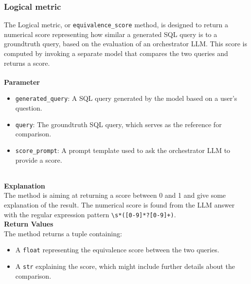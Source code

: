 \documentclass[12pt,a4paper]{article}
\begin{document}
\subsubsection*{Logical metric}




The Logical metric, or \texttt{equivalence\_score} method, is designed to return a numerical score representing how similar a generated SQL query is to a groundtruth query, based on the evaluation of an orchestrator LLM. This score is computed by invoking a separate model that compares the two queries and returns a score.
\\
\\
\textbf{Parameter}
\begin{itemize}
    \item \texttt{generated\_query}: A SQL query generated by the model based on a user's question.
    \item \texttt{query}: The groundtruth SQL query, which serves as the reference for comparison.
    \item \texttt{score\_prompt}: A prompt template used to ask the orchestrator LLM to provide a score.
\end{itemize}
\\
\textbf{Explanation}
\\
The method is aiming at returning a score between 0 and 1 and give some explanation of the result. The numerical score is found from the LLM answer with the regular expression pattern \texttt{\textbackslash s*([0-9]*\.?[0-9]+)}.
\\

\textbf{Return Values}
\\
The method returns a tuple containing:
\begin{itemize}
    \item A \texttt{float} representing the equivalence score between the two queries.
    \item A \texttt{str} explaining the score, which might include further details about the comparison.
\end{itemize}
\end{document}
